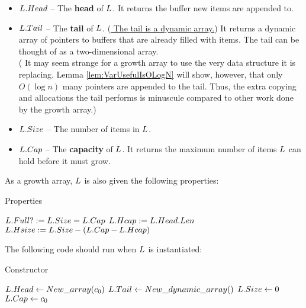 \begin{itemize}
	\item $L.Head$ -- The \textbf{head} of $\VarList$. It returns the buffer new items are appended to.
	\item $L.Tail$ -- The \textbf{tail} of $\VarList$. (\underline{{\HdrNote} The tail is a dynamic array.}) It returns a dynamic array of pointers to buffers that are already filled with items. The tail can be thought of as a two-dimensional array.\\
	({\HdrRemark} It may seem strange for a growth array to use the very data structure it is replacing. Lemma \ref{lem:VarUsefulIsOLogN} will show, however, that only $O(\log n)$ many pointers are appended to the tail. Thus, the extra copying and allocations the tail performs is minuscule compared to other work done by the growth array.)
	\item $L.Size$ -- The number of items in $\VarList$.
	\item $L.Cap$ -- The \textbf{capacity} of $\VarList$. It returns the maximum number of items $\VarList$ can hold before it must grow.
\end{itemize}

As a growth array, $\VarList$ is also given the following properties:

\begin{algorithm}[H]
	\caption{Properties \TextGrowthArray}
	\begin{algorithmic}
		\State $L.Full? := L.Size = L.Cap$
		\State
		\State $L.Hcap := L.Head.Len$
		\State
		\State $L.Hsize := L.Size - \left(L.Cap - L.Hcap\right)$
	\end{algorithmic}
\end{algorithm}

The following code should run when $\VarList$ is instantiated:

\begin{algorithm}[H]
	\caption{Constructor \TextGrowthArray}
	\begin{algorithmic}
		\Procedure{$\FuncConstructor$}{$\VarList$}
			\State $L.Head \gets New\_array(c_0)$
			\State $L.Tail \gets New\_dynamic\_array()$
			\State $L.Size \gets 0$
			\State $L.Cap \gets c_0$
		\EndProcedure
	\end{algorithmic}
\end{algorithm}